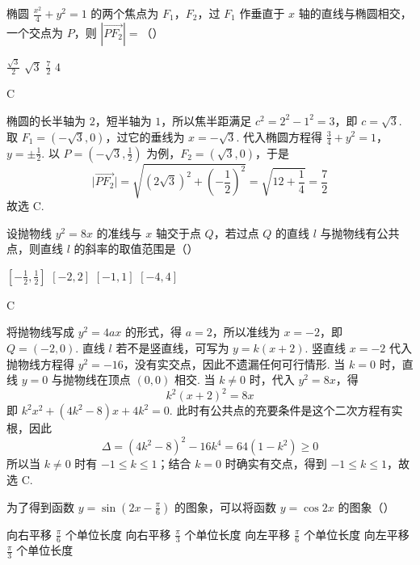 \begin{problem}
椭圆 \(\frac{x^2}{4} + y^2 = 1\) 的两个焦点为 \(F_1\)，\(F_2\)，过 \(F_1\) 作垂直于 \(x\) 轴的直线与椭圆相交，一个交点为 \(P\)，则 \(|\overrightarrow{PF_2}| =\)（\quad）

\choices
    {\(\frac{\sqrt{3}}{2}\)}
    {\(\sqrt{3}\)}
    {\(\frac{7}{2}\)}
    {\(4\)}
\end{problem}

\begin{answer}
C
\end{answer}

\begin{solution}
椭圆的长半轴为 \(2\)，短半轴为 \(1\)，所以焦半距满足 \(c^2=2^2-1^2=3\)，即 \(c=\sqrt3\). 取 \(F_1=(-\sqrt3,0)\)，过它的垂线为 \(x=-\sqrt3\). 代入椭圆方程得
\(\frac34+y^2=1\)，\(y=\pm\frac12\).
以 \(P=(-\sqrt3,\frac12)\) 为例，\(F_2=(\sqrt3,0)\)，于是
\[
\lvert\overrightarrow{PF_2}\rvert=\sqrt{(2\sqrt3)^2+\left(-\frac12\right)^2}=\sqrt{12+\frac14}=\frac72
\]
故选 C.
\end{solution}

\begin{problem}
设抛物线 \( y^{2} = 8x \) 的准线与 \( x \) 轴交于点 \(Q\)，若过点 \(Q\) 的直线 \( l \) 与抛物线有公共点，则直线 \( l \) 的斜率的取值范围是（\quad）

\choices
    {\(\left[-\frac{1}{2}, \frac{1}{2}\right]\)}
    {\([-2, 2]\)}
    {\([-1, 1]\)}
    {\([-4, 4]\)}
\end{problem}

\begin{answer}
C
\end{answer}

\begin{solution}
将抛物线写成 \(y^2=4ax\) 的形式，得 \(a=2\)，所以准线为 \(x=-2\)，即 \(Q=(-2,0)\). 直线 \(l\) 若不是竖直线，可写为 \(y=k(x+2)\). 竖直线 \(x=-2\) 代入抛物线方程得 \(y^2=-16\)，没有实交点，因此不遗漏任何可行情形. 当 \(k=0\) 时，直线 \(y=0\) 与抛物线在顶点 \((0,0)\) 相交. 当 \(k\ne0\) 时，代入 \(y^2=8x\)，得
\[
k^2(x+2)^2=8x
\]
即 \(k^2x^2+(4k^2-8)x+4k^2=0\). 此时有公共点的充要条件是这个二次方程有实根，因此
\[
\Delta=(4k^2-8)^2-16k^4=64(1-k^2)\geqslant0
\]
所以当 \(k\ne0\) 时有 \(-1\leqslant k\leqslant1\)；结合 \(k=0\) 时确实有交点，得到 \(-1\leqslant k\leqslant1\)，故选 C.
\end{solution}

\begin{problem}
为了得到函数 \( y = \sin \left(2x - \frac{\pi}{6}\right) \) 的图象，可以将函数 \( y = \cos 2x \) 的图象（\quad）

\choices
    {向右平移 \(\frac{\pi}{6}\) 个单位长度}
    {向右平移 \(\frac{\pi}{3}\) 个单位长度}
    {向左平移 \(\frac{\pi}{6}\) 个单位长度}
    {向左平移 \(\frac{\pi}{3}\) 个单位长度}
\end{problem}

